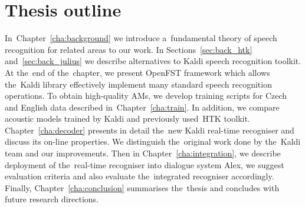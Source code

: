 \section*{Thesis outline} 
In~Chapter~\ref{cha:background} we introduce a~fundamental theory of speech recognition for related areas to our work.
In Sections~\ref{sec:back_htk} and~\ref{sec:back_julius} we describe alternatives to Kaldi speech recognition toolkit. 
At the~end of the~chapter, we present OpenFST framework which allows the~Kaldi library effectively implement many standard speech recognition operations. 
To obtain high-quality \aclp{AM}, we develop training scripts for Czech and English data described in~Chapter~\ref{cha:train}. 
In addition, we compare acoustic models trained by Kaldi and previously used~\ac{HTK} toolkit. 
Chapter~\ref{cha:decoder} presents in detail the~new Kaldi real-time recogniser and discuss its on-line properties.
We distinguish the~original work done by the~Kaldi team and our improvements. 
Then in Chapter~\ref{cha:integration}, we describe deployment of the~real-time recogniser into dialogue system Alex, we suggest evaluation criteria and also evaluate the~integrated recogniser accordingly.
Finally, Chapter~\ref{cha:conclusion} summarises the~thesis and concludes with future research directions.
